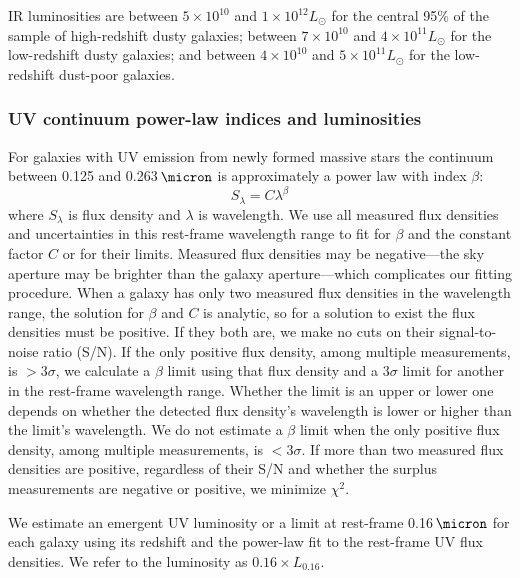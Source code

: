 \documentclass[preprint]{aastex}
\begin{document}
IR luminosities are between $5\times10^{10}$ and $1\times10^{12} L_{\odot}$
for the central 95\% of the sample of high-redshift dusty galaxies; between
$7\times10^{10}$ and $4\times10^{11} L_{\odot}$ for the low-redshift dusty
galaxies; and between $4\times10^{10}$ and $5\times10^{11} L_{\odot}$ for
the low-redshift dust-poor galaxies.

\subsubsection{UV continuum power-law indices and luminosities}

For galaxies with UV emission from newly formed massive stars the continuum
between 0.125 and 0.263$\,\micron$ is approximately a power law with index
$\beta$:
\begin{equation}
S_{\lambda} = C\lambda^{\beta}
\end{equation}
where $S_{\lambda}$ is flux density and $\lambda$ is wavelength.
We use all measured flux densities and uncertainties in this rest-frame
wavelength range to fit for $\beta$ and the constant factor $C$ or
for their limits.  Measured flux densities may be negative---the sky aperture
may be brighter than the galaxy aperture---which
complicates our fitting procedure.  When a galaxy has only two measured flux
densities in the wavelength range, the solution for $\beta$ and $C$ is
analytic, so for a solution to exist the flux densities must be positive.  If
they both are, we make no cuts on their signal-to-noise ratio (S/N).
If the only positive flux density, among multiple measurements, is $> 3\sigma$,
we calculate a $\beta$ limit using that flux density and a $3\sigma$ limit for
another in the rest-frame wavelength range.  Whether the limit is an upper or
lower one depends on whether the detected flux density's wavelength is lower
or higher than the limit's wavelength.  We do not estimate a $\beta$ limit when
the only positive flux density, among multiple measurements, is $< 3\sigma$.
If more than two measured flux densities are positive, regardless of their S/N
and whether the surplus measurements are negative or positive, we minimize
$\chi^{2}$.

We estimate an emergent UV luminosity or a
limit at rest-frame 0.16$\,\micron$ for each galaxy using its redshift and
the power-law fit to the rest-frame UV flux densities.  We refer to the
luminosity as $0.16 \times L_{0.16}$.
\end{document}
